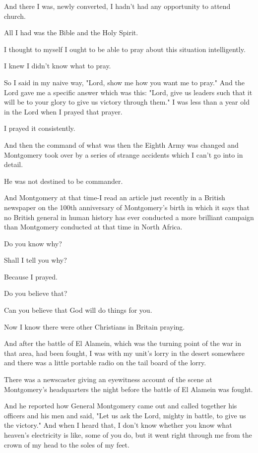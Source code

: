 \documentclass[11pt]{article}
\begin{document}
And there I was, newly converted, I hadn't had
any opportunity to attend church.

All I had was the Bible and the Holy Spirit.

I thought to myself I ought to be able to pray
about this situation intelligently.

I knew I didn't know what to pray.

So I said in my naive way, "Lord, show me how
you want me to pray." And the Lord gave me a
specific answer which was this: "Lord, give us
leaders such that it will be to your glory to
give us victory through them." I was less than
a year old in the Lord when I prayed that
prayer.

I prayed it consistently.

And then the command of what was then the
Eighth Army was changed and Montgomery took
over by a series of strange accidents which I
can't go into in detail.

He was not destined to be commander.

And Montgomery at that time-I read an article
just recently in a British newspaper on the
100th anniversary of Montgomery's birth in
which it says that no British general in human
history has ever conducted a more brilliant
campaign than Montgomery conducted at that
time in North Africa.

Do you know why?

Shall I tell you why?

Because I prayed.

Do you believe that?

Can you believe that God will do things for
you.

Now I know there were other Christians in
Britain praying.

And after the battle of El Alamein, which was
the turning point of the war in that area, had
been fought, I was with my unit's lorry in the
desert somewhere and there was a little
portable radio on the tail board of the lorry.

There was a newscaster giving an eyewitness
account of the scene at Montgomery's
headquarters the night before the battle of El
Alamein was fought.

And he reported how General Montgomery came
out and called together his officers and his
men and said, "Let us ask the Lord, mighty in
battle, to give us the victory." And when I
heard that, I don't know whether you know what
heaven's electricity is like, some of you do,
but it went right through me from the crown of
my head to the soles of my feet.
\end{document}
